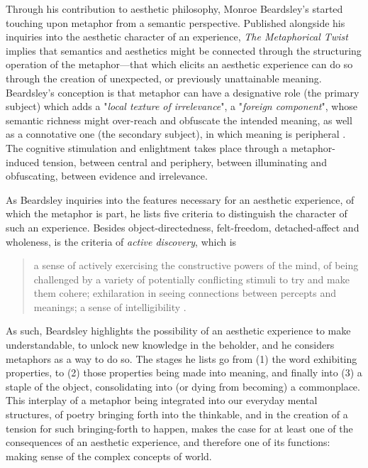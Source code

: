 Through his contribution to aesthetic philosophy, Monroe Beardsley's started touching upon metaphor from a semantic perspective. Published alongside his inquiries into the aesthetic character of an experience, \emph{The Metaphorical Twist} implies that semantics and aesthetics might be connected through the structuring operation of the metaphor—that which elicits an aesthetic experience can do so through the creation of unexpected, or previously unattainable meaning. Beardsley's conception is that metaphor can have a designative role (the primary subject) which adds a "\emph{local texture of irrelevance}", a "\emph{foreign component}", whose semantic richness might over-reach and obfuscate the intended meaning, as well as a connotative one (the secondary subject), in which meaning is peripheral \citep{beardsley_metaphorical_1962}. The cognitive stimulation and enlightment takes place through a metaphor-induced tension, between central and periphery, between illuminating and obfuscating, between evidence and irrelevance.

As Beardsley inquiries into the features necessary for an aesthetic experience, of which the metaphor is part, he lists five criteria to distinguish the character of such an experience. Besides object-directedness, felt-freedom, detached-affect and wholeness, is the criteria of \emph{active discovery}, which is

\begin{quote}
    a sense of actively exercising the constructive powers of the mind, of being challenged by a variety of potentially conflicting stimuli to try and make them cohere; exhilaration in seeing connections between percepts and meanings; a sense of intelligibility \citep{beardsley_aesthetic_1970}.
\end{quote}

As such, Beardsley highlights the possibility of an aesthetic experience to make understandable, to unlock new knowledge in the beholder, and he considers metaphors as a way to do so. The stages he lists go from (1) the word exhibiting properties, to (2) those properties being made into meaning, and finally into (3) a staple of the object, consolidating into (or dying from becoming) a commonplace. This interplay of a metaphor being integrated into our everyday mental structures, of poetry bringing forth into the thinkable, and in the creation of a tension for such bringing-forth to happen, makes the case for at least one of the consequences of an aesthetic experience, and therefore one of its functions: making sense of the complex concepts of world.

